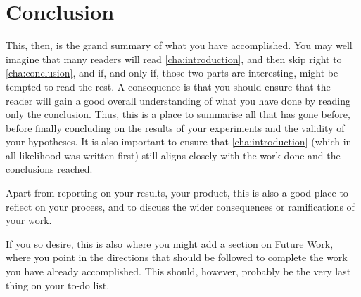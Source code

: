 \chapter{Conclusion}
\label{cha:conclusion}

This, then, is the grand summary of what you have accomplished.  You
may well imagine that many readers will read
\autoref{cha:introduction}, and then skip right to
\autoref{cha:conclusion}, and if, and only if, those two parts are
interesting, might be tempted to read the rest. A consequence is that
you should ensure that the reader will gain a good overall
understanding of what you have done by reading only the conclusion.
Thus, this is a place to summarise all that has gone before, before
finally concluding on the results of your experiments and the validity
of your hypotheses. It is also important to ensure that
\autoref{cha:introduction} (which in all likelihood was written first)
still aligns closely with the work done and the conclusions reached.

Apart from reporting on your results, \ie your product, this is also a
good place to reflect on your process, and to discuss the wider
consequences or ramifications of your work.

If you so desire, this is also where you might add a section on Future
Work, where you point in the directions that should be followed to
complete the work you have already accomplished. This should, however,
probably be the very last thing on your to-do list.


